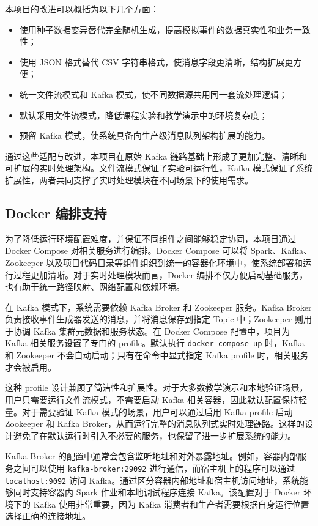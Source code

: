 \documentclass[12pt,hyperref,a4paper,UTF8]{ctexart}
\begin{document}
本项目的改进可以概括为以下几个方面：
\begin{itemize}
    \item 使用种子数据变异替代完全随机生成，提高模拟事件的数据真实性和业务一致性；
    \item 使用 JSON 格式替代 CSV 字符串格式，使消息字段更清晰，结构扩展更方便；
    \item 统一文件流模式和 Kafka 模式，使不同数据源共用同一套流处理逻辑；
    \item 默认采用文件流模式，降低课程实验和教学演示中的环境复杂度；
    \item 预留 Kafka 模式，使系统具备向生产级消息队列架构扩展的能力。
\end{itemize}

通过这些适配与改进，本项目在原始 Kafka 链路基础上形成了更加完整、清晰和可扩展的实时处理架构。文件流模式保证了实验可运行性，Kafka 模式保证了系统扩展性，两者共同支撑了实时处理模块在不同场景下的使用需求。

\subsection{Docker 编排支持}

为了降低运行环境配置难度，并保证不同组件之间能够稳定协同，本项目通过 Docker Compose 对相关服务进行编排。Docker Compose 可以将 Spark、Kafka、Zookeeper 以及项目代码目录等组件组织到统一的容器化环境中，使系统部署和运行过程更加清晰。对于实时处理模块而言，Docker 编排不仅方便启动基础服务，也有助于统一路径映射、网络配置和依赖环境。

在 Kafka 模式下，系统需要依赖 Kafka Broker 和 Zookeeper 服务。Kafka Broker 负责接收事件生成器发送的消息，并将消息保存到指定 Topic 中；Zookeeper 则用于协调 Kafka 集群元数据和服务状态。在 Docker Compose 配置中，项目为 Kafka 相关服务设置了专门的 profile。默认执行 \texttt{docker-compose up} 时，Kafka 和 Zookeeper 不会自动启动；只有在命令中显式指定 Kafka profile 时，相关服务才会被启用。

这种 profile 设计兼顾了简洁性和扩展性。对于大多数教学演示和本地验证场景，用户只需要运行文件流模式，不需要启动 Kafka 相关容器，因此默认配置保持轻量。对于需要验证 Kafka 模式的场景，用户可以通过启用 Kafka profile 启动 Zookeeper 和 Kafka Broker，从而运行完整的消息队列式实时处理链路。这样的设计避免了在默认运行时引入不必要的服务，也保留了进一步扩展系统的能力。

Kafka Broker 的配置中通常会包含监听地址和对外暴露地址。例如，容器内部服务之间可以使用 \texttt{kafka-broker:29092} 进行通信，而宿主机上的程序可以通过 \texttt{localhost:9092} 访问 Kafka。通过区分容器内部地址和宿主机访问地址，系统能够同时支持容器内 Spark 作业和本地调试程序连接 Kafka。该配置对于 Docker 环境下的 Kafka 使用非常重要，因为 Kafka 消费者和生产者需要根据自身运行位置选择正确的连接地址。
\end{document}

